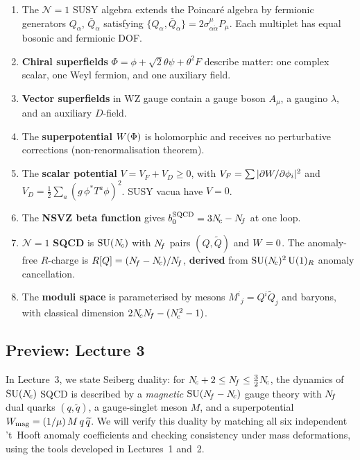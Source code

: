 \documentclass[11pt,a4paper]{article}
\begin{document}
\begin{enumerate}
  \item The $\mathcal{N}=1$ SUSY algebra extends the Poincar\'e algebra
    by fermionic generators $Q_\alpha$, $\bar{Q}_{\dot\alpha}$ satisfying
    $\{Q_\alpha, \bar{Q}_{\dot\alpha}\} = 2\sigma^\mu_{\alpha\dot\alpha}
    P_\mu$.  Each multiplet has equal bosonic and fermionic DOF.

  \item \textbf{Chiral superfields} $\Phi = \phi + \sqrt{2}\theta\psi +
    \theta^2 F$ describe matter: one complex scalar, one Weyl fermion,
    and one auxiliary field.

  \item \textbf{Vector superfields} in WZ gauge contain a gauge boson
    $A_\mu$, a gaugino $\lambda$, and an auxiliary $D$-field.

  \item The \textbf{superpotential} $W(\Phi)$ is holomorphic and
    receives no perturbative corrections (non-renormalisation theorem).

  \item The \textbf{scalar potential} $V = V_F + V_D \geq 0$, with
    $V_F = \sum |\partial W / \partial \phi_i|^2$ and
    $V_D = \frac{1}{2}\sum_a (g\, \phi^* T^a \phi)^2$.
    SUSY vacua have $V = 0$.

  \item The \textbf{NSVZ beta function} gives $b_0^{\mathrm{SQCD}} = 3N_{\!c} - N_{\!f}$
    at one loop.

  \item $\mathcal{N}=1$ \textbf{SQCD} is $\mathrm{SU}(N_{\!c})$ with $N_{\!f}$ pairs
    $(Q, \widetilde{Q})$ and $W = 0$.  The anomaly-free
    $R$-charge is $R[Q] = (N_{\!f} - N_{\!c})/N_{\!f}$, \textbf{derived}
    from $\mathrm{SU}(N_{\!c})^2\,\mathrm{U}(1)_R$ anomaly cancellation.

  \item The \textbf{moduli space} is parameterised by mesons
    $M^i{}_j = Q^i \widetilde{Q}_j$ and baryons, with classical
    dimension $2N_{\!c}N_{\!f} - (N_{\!c}^2 - 1)$.
\end{enumerate}

\subsection{Preview: Lecture 3}

In Lecture~3, we state Seiberg duality: for $N_{\!c} + 2 \leq N_{\!f} \leq
\tfrac{3}{2}N_{\!c}$, the \IR{} dynamics of $\mathrm{SU}(N_{\!c})$ SQCD is described by
a \emph{magnetic} $\mathrm{SU}(N_{\!f} - N_{\!c})$ gauge theory with $N_{\!f}$ dual quarks
$(q, \widetilde{q})$, a gauge-singlet meson $M$, and a superpotential
$W_{\text{mag}} = (1/\mu)\, M\, q\, \widetilde{q}$.  We will verify
this duality by matching all six independent 't~Hooft anomaly coefficients
and checking consistency under mass deformations, using the tools
developed in Lectures~1 and~2.
\end{document}
